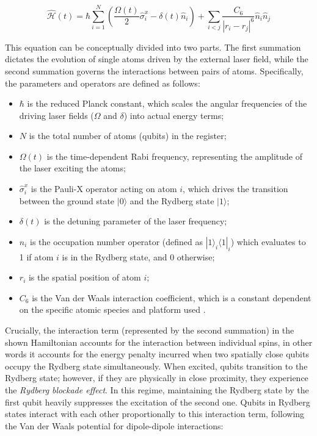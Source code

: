 \begin{equation}
    \hat{\mathcal{H}}(t)=\hbar\sum_{i=1}^{N}\left(\frac{\Omega(t)}{2}\hat{\sigma}_{i}^{x}-\delta(t)\hat{n}_{i}\right)+\sum_{i<j}\frac{C_{6}}{|r_{i}-r_{j}|^{6}}\hat{n}_{i}\hat{n}_{j}
\end{equation}

This equation can be conceptually divided into two parts. The first summation dictates the evolution of single atoms driven by the external laser field, while the second summation governs the interactions between pairs of atoms. Specifically, the parameters and operators are defined as follows:
\begin{itemize}
    \item $\hbar$ is the reduced Planck constant, which scales the angular frequencies of the driving laser fields ($\Omega$ and $\delta$) into actual energy terms;    \item $N$ is the total number of atoms (qubits) in the register;
    \item $\Omega(t)$ is the time-dependent Rabi frequency, representing the amplitude of the laser exciting the atoms;
    \item $\hat{\sigma}_{i}^{x}$ is the Pauli-X operator acting on atom $i$, which drives the transition between the ground state $|0\rangle$ and the Rydberg state $|1\rangle$;
    \item $\delta(t)$ is the detuning parameter of the laser frequency;
    \item $\hat{n}_{i}$ is the occupation number operator (defined as $|1\rangle_i\langle 1|_i$) which evaluates to 1 if atom $i$ is in the Rydberg state, and 0 otherwise;
    \item $r_i$ is the spatial position of atom $i$;
    \item $C_6$ is the Van der Waals interaction coefficient, which is a constant dependent on the specific atomic species and platform used \cite{nowak2026satellitemissionplanningrydberg}.
\end{itemize}

Crucially, the interaction term (represented by the second summation) in the shown Hamiltonian accounts for the interaction between individual spins, in other words it accounts for the energy penalty incurred when two spatially close qubits occupy the Rydberg state simultaneously. 
When excited, qubits transition to the Rydberg state; however, if they are physically in close proximity, they experience the \textit{Rydberg blockade effect}. In this regime, maintaining the Rydberg state by the first qubit heavily suppresses the excitation of the second one. 
Qubits in Rydberg states interact with each other proportionally to this interaction term, following the Van der Waals potential for dipole-dipole interactions:

